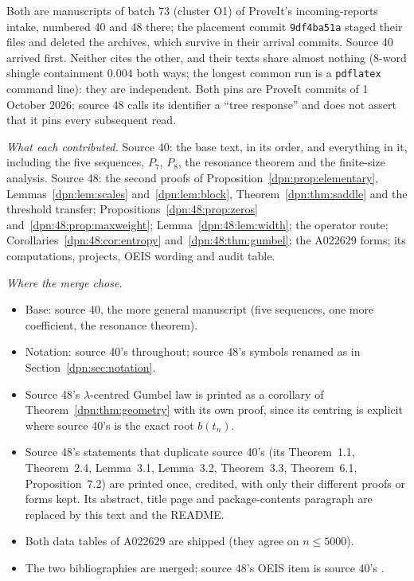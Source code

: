 \documentclass[11pt]{article}
\numberwithin{equation}{section}
\theoremstyle{definition}\newtheorem{definition}[theorem]{Definition}
\theoremstyle{remark}\newtheorem{remark}[theorem]{Remark}
\begin{document}
Both are manuscripts of batch 73 (cluster O1) of ProveIt's incoming-reports
intake, numbered 40 and 48 there; the placement commit \texttt{9df4ba51a}
staged their files and deleted the archives, which survive in their arrival
commits.  Source 40 arrived first.  Neither cites the other, and their texts
share almost nothing (8-word shingle containment $0.004$ both ways; the
longest common run is a \verb|pdflatex| command line): they are independent.
Both pins are ProveIt commits of 1 October 2026; source 48 calls its
identifier a ``tree response'' and does not assert that it pins every
subsequent read.

\emph{What each contributed.}  Source 40: the base text, in its order, and
everything in it, including the five sequences, $P_7$, $P_8$, the resonance
theorem and the finite-size analysis.  Source 48: the second proofs of
Proposition~\ref{dpn:prop:elementary}, Lemmas~\ref{dpn:lem:scales}
and~\ref{dpn:lem:block}, Theorem~\ref{dpn:thm:saddle} and the threshold
transfer; Propositions~\ref{dpn:48:prop:zeros}
and~\ref{dpn:48:prop:maxweight}; Lemma~\ref{dpn:48:lem:width}; the operator
route; Corollaries~\ref{dpn:48:cor:entropy} and~\ref{dpn:48:thm:gumbel}; the
A022629 forms; its computations, projects, OEIS wording and audit table.

\emph{Where the merge chose.}
\begin{itemize}
\item Base: source 40, the more general manuscript (five sequences, one more
      coefficient, the resonance theorem).
\item Notation: source 40's throughout; source 48's symbols renamed as in
      Section~\ref{dpn:sec:notation}.
\item Source 48's $\lambda$-centred Gumbel law is printed as a corollary of
      Theorem~\ref{dpn:thm:geometry} with its own proof, since its centring
      is explicit where source 40's is the exact root $b(t_n)$.
\item Source 48's statements that duplicate source 40's (its Theorem~1.1,
      Theorem~2.4, Lemma~3.1, Lemma~3.2, Theorem~3.3, Theorem~6.1,
      Proposition~7.2) are printed once, credited, with only their different
      proofs or forms kept.  Its abstract, title page and package-contents
      paragraph are replaced by this text and the README.
\item Both data tables of A022629 are shipped (they agree on $n\le5000$).
\item The two bibliographies are merged; source 48's OEIS item is source 40's
      \cite{oeis1}.
\end{itemize}
\end{document}

